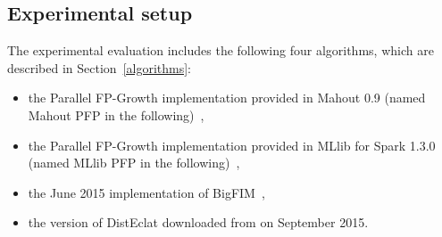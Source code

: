 \documentclass[preprint,review,12pt]{elsarticle}
\begin{document}

\subsection{Experimental setup}
The experimental evaluation includes the following four algorithms, 
which are described in Section~\ref{algorithms}:
\begin{itemize}
\item the Parallel FP-Growth implementation provided in Mahout 0.9 (named Mahout PFP in the following)~\cite{Mahout},
\item the Parallel FP-Growth implementation provided in MLlib for Spark 1.3.0 (named MLlib PFP in the following)~\cite{MLLib},
\item the June 2015 implementation of BigFIM~\cite{Bigfim_github},
\item the version of DistEclat downloaded from \cite{Bigfim_github} on September 2015.
\end{itemize}

\end{document}
